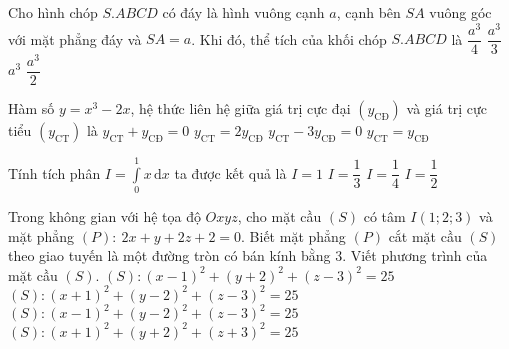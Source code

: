 \begin{ex}%
Cho hình chóp $S.ABCD$ có đáy là hình vuông cạnh $a$, cạnh bên $SA$ vuông góc với mặt phẳng đáy và $SA=a$. Khi đó, thể tích của khối chóp $S.ABCD$ là
\choice
{$\dfrac{a^3}{4}$}
{\True $\dfrac{a^3}{3}$}
{$a^3$}
{$\dfrac{a^3}{2}$}
\end{ex}
\begin{ex}%
Hàm số $y=x^3-2x$, hệ thức liên hệ giữa giá trị cực đại $(y_{\textrm{CĐ}})$ và giá trị cực tiểu $(y_{\textrm{CT}})$ là
\choice
{\True $y_{\textrm{CT}}+y_{\textrm{CĐ}}=0$}
{$y_{\textrm{CT}}=2y_{\textrm{CĐ}}$}
{$y_{\textrm{CT}}-3y_{\textrm{CĐ}}=0$}
{$y_{\textrm{CT}}=y_{\textrm{CĐ}}$}
\end{ex}
\begin{ex}%
Tính tích phân $I=\displaystyle \int\limits_0^1x\mathrm{\,d}x$ ta được kết quả là
\choice
{$I=1$}
{$I=\dfrac{1}{3}$}
{$I=\dfrac{1}{4}$}
{\True $I=\dfrac{1}{2}$}
\end{ex}
\begin{ex}%
Trong không gian với hệ tọa độ $Oxyz$, cho mặt cầu $(S)$ có tâm $I(1;2;3)$ và mặt phẳng $(P):\ 2x+y+2z+2=0$. Biết mặt phẳng $(P)$ cắt mặt cầu $(S)$ theo giao tuyến là một đường tròn có bán kính bằng $3$. Viết phương trình của mặt cầu $(S).$
\choice
{$(S): (x-1)^2+(y+2)^2+(z-3)^2=25$}
{$(S): (x+1)^2+(y-2)^2+(z-3)^2=25$}
{\True $(S): (x-1)^2+(y-2)^2+(z-3)^2=25$}
{$(S): (x+1)^2+(y+2)^2+(z+3)^2=25$}
\end{ex}

